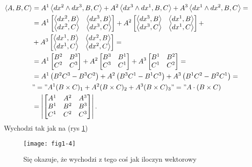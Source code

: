 \documentclass[../main.tex]{subfiles}
\begin{document}
\begin{align*}
    \left<A, B, C \right> &= A^1 \left<dx^2\land dx^3, B, C \right> + A^2\left<dx^3\land dx^1, B, C \right> + A^3 \left<dx^1\land dx^2, B, C \right> = \\
    &= A^1 \begin{bmatrix} \left<dx^2, B \right>& \left<dx^3, B \right>\\ \left<dx^2, C \right>& \left<dx^3, C \right> \end{bmatrix} + A^2 \begin{bmatrix} \left<dx^3, B \right> & \left<dx^1, B \right> \\ \left<dx^3, C \right> & \left<dx^1, C \right> \end{bmatrix} + \\
        &+ A^3\begin{bmatrix} \left<dx^1, B \right> & \left<dx^2, B \right> \\ \left<dx^1, C \right> & \left<dx^2, C \right> \end{bmatrix}  =\\
        &= A^1\begin{bmatrix} B^2&B^3\\C^2&C^3 \end{bmatrix} + A^2\begin{bmatrix} B^3&B^1\\C^3&C^1 \end{bmatrix} + A^3\begin{bmatrix} B^1&B^2\\C^1&C^2 \end{bmatrix} =\\
            &=  A^1 \left( B^2C^3 - B^3C^2 \right) + A^2 \left( B^3C^1 - B^1C^3 \right) + A^3 \left( B^1C^2 - B^2C^1 \right) =\\
            &"=" A^1 (B\times C)_1 + A^2(B\times C)_2 + A^3(B\times C)_3 "=" A\cdot (B\times C) \\
            &= \left|\begin{bmatrix} A^1 & A^2 & A^3\\ B^1&B^2&B^3\\ C^1&C^2&C^3 \end{bmatrix}\right|
.\end{align*}
Wychodzi tak jak na (rys \ref{fig:fig1-4})\\
\begin{figure}[h]
    \centering
    \texttt{[image: fig1-4]}
    \caption{Się okazuje, że wychodzi z tego coś jak iloczyn wektorowy}
    \label{fig:fig1-4}
\end{figure}
\end{document}
